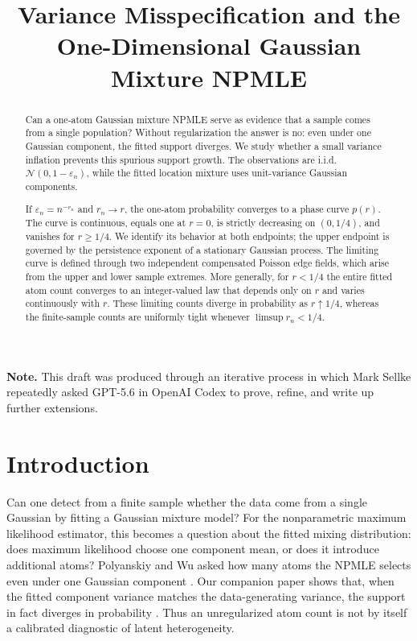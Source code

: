 \documentclass[11pt]{article}
\title{Variance Misspecification and the One-Dimensional Gaussian Mixture NPMLE}
\author{}
\date{}
\theoremstyle{definition}
\numberwithin{equation}{section}
\newcommand{\cN}{\mathcal{N}}
\newcommand{\eps}{\varepsilon}
\begin{document}
\maketitle

\begin{abstract}
Can a one-atom Gaussian mixture NPMLE serve as evidence that a sample comes
from a single population? Without regularization the answer is no: even under
one Gaussian component, the fitted support diverges. We study whether a small
variance inflation prevents this spurious support growth. The observations are i.i.d.\
\(\cN(0,1-\eps_n)\), while the fitted location mixture uses unit-variance
Gaussian components.

If \(\eps_n=n^{-r_n}\) and \(r_n\to r\), the one-atom probability converges to
a phase curve \(p(r)\). The curve is continuous, equals one at \(r=0\), is
strictly decreasing on \((0,1/4)\), and vanishes for \(r\ge1/4\). We identify
its behavior at both endpoints; the upper endpoint is governed by the
persistence exponent of a stationary Gaussian process. The limiting curve is
defined through two independent compensated Poisson edge fields, which arise
from the upper and lower sample extremes. More generally, for \(r<1/4\) the
entire fitted atom count converges to an integer-valued law that depends only
on \(r\) and varies continuously with \(r\). These limiting counts diverge in probability
as \(r\uparrow1/4\), whereas the finite-sample counts are uniformly tight
whenever \(\limsup r_n<1/4\).
\end{abstract}

\medskip
\noindent\textbf{Note.} This draft was produced through an iterative process in which Mark Sellke repeatedly asked GPT-5.6 in OpenAI Codex to prove, refine, and write up further extensions.
\medskip

\setcounter{tocdepth}{1}
\tableofcontents

\section{Introduction}

Can one detect from a finite sample whether the data come from a single
Gaussian by fitting a Gaussian mixture model? For the nonparametric maximum
likelihood estimator, this becomes a question about the fitted mixing
distribution: does maximum likelihood choose one component mean, or does it
introduce additional atoms? Polyanskiy and Wu asked how many atoms the NPMLE
selects even under one Gaussian component
\cite[Section~5.6]{polyanskiy2020self}. Our companion paper shows that, when
the fitted component variance matches the data-generating variance, the
support in fact diverges in probability \cite{supportDivergenceCompanion}.
Thus an unregularized atom count is not by itself a calibrated diagnostic of
latent heterogeneity.
\end{document}

